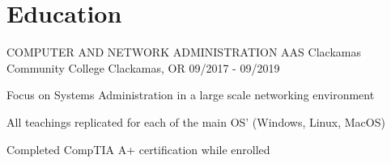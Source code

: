\vspace{-\acvSectionTopSkip}
\section{Education}
\cventry
{COMPUTER AND NETWORK ADMINISTRATION AAS} %
{Clackamas Community College} %
{Clackamas, OR} %
{09/2017 - 09/2019} %
\begin{cvitems}
\item {Focus on Systems Administration in a large scale networking environment}
\item {All teachings replicated for each of the main OS' (Windows, Linux, MacOS)}
\item {Completed CompTIA A+ certification while enrolled}
\end{cvitems}

